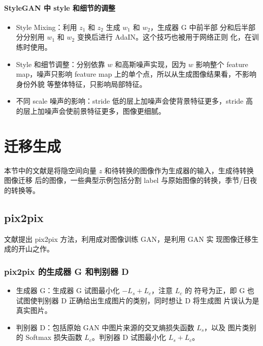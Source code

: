 \paragraph{StyleGAN 中 style 和细节的调整}
\begin{itemize}
  \item Style Mixing：利用 $z_1$ 和 $z_2$ 生成 $w_1$ 和 $w_2$，生成器 G 中前半部
    分和后半部分分别用 $w_1$ 和 $w_2$ 变换后进行 AdaIN。这个技巧也被用于网络正则
    化，在训练时使用。
  \item Style 和细节调整：分别依靠 $w$ 和高斯噪声实现，因为 $w$ 影响整个 feature
    map，噪声只影响 feature map 上的单个点，所以从生成图像结果看，不影响身份外貌
    等整体特征，只影响局部特征。
  \item 不同 scale 噪声的影响：stride 低的层上加噪声会使背景特征更多，stride 高
    的层上加噪声会使前景特征更多，图像更细腻。
\end{itemize}

\section{迁移生成}
本节中的文献是将隐空间向量 $z$ 和待转换的图像作为生成器的输入，生成待转换图像迁移
后的图像，一些典型示例包括分割 label 与原始图像的转换，季节/日夜的转换等。

\subsection{pix2pix}
文献提出 pix2pix 方法，利用成对图像训练 GAN，是利用 GAN 实
现图像迁移生成的开山之作。

\subsubsection{pix2pix 的生成器 G 和判别器 D}
\begin{itemize}
  \item 生成器 G：生成器 G 试图最小化 $-L_{s} + L_{c}$，注意 $L_{c}$ 的
    符号为正，即 G 也试图使判别器 D 正确给出生成图片的类别，同时想让 D 将生成图
    片误认为是真实图片。
  \item 判别器 D：包括原始 GAN 中图片来源的交叉熵损失函数 $L_{s}$，以及
    图片类别的 Softmax 损失函数 $L_{c}$。判别器 D 试图最小化 $L_{s} + L_{c}$。
\end{itemize}

